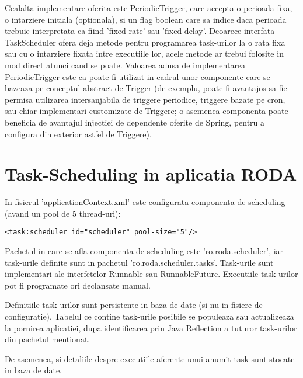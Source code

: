 Cealalta implementare oferita este PeriodicTrigger, care accepta o perioada fixa, o intarziere initiala (optionala), 
si un flag boolean care sa indice daca perioada trebuie interpretata ca fiind 'fixed-rate' sau 'fixed-delay'.
Deoarece interfata TaskScheduler ofera deja metode pentru programarea task-urilor la o rata fixa sau cu o intarziere fixata intre executiile lor,
acele metode ar trebui folosite in mod direct atunci cand se poate.
Valoarea adusa de implementarea PeriodicTrigger este ca poate fi utilizat in cadrul unor componente care se bazeaza pe conceptul abstract de Trigger
(de exemplu, poate fi avantajos sa fie permisa utilizarea intersanjabila de triggere periodice, triggere bazate pe cron, sau chiar implementari customizate de Triggere;
o asemenea componenta poate beneficia de avantajul injectiei de dependente oferite de Spring, pentru a configura din exterior astfel de Triggere).

\section{Task-Scheduling in aplicatia RODA}

In fisierul 'applicationContext.xml' este configurata componenta de scheduling (avand un pool de 5 thread-uri):

\begin{lstlisting}
<task:scheduler id="scheduler" pool-size="5"/>
\end{lstlisting}

Pachetul in care se afla componenta de scheduling este 'ro.roda.scheduler', iar task-urile definite sunt in pachetul 'ro.roda.scheduler.tasks'.
Task-urile sunt implementari ale interfetelor Runnable sau RunnableFuture. 
Executiile task-urilor pot fi programate ori declansate manual.

Definitiile task-urilor sunt persistente in baza de date (si nu in fisiere de configuratie).
Tabelul ce contine task-urile posibile se populeaza sau actualizeaza la pornirea aplicatiei, 
dupa identificarea prin Java Reflection a tuturor task-urilor din pachetul mentionat.

De asemenea, si detaliile despre executiile aferente unui anumit task sunt stocate in baza de date.

